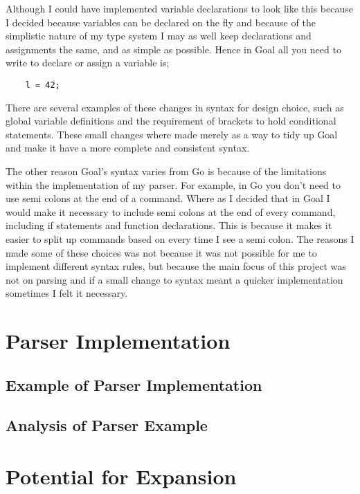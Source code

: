 Although I could have implemented variable declarations to look like this because I decided because variables can be declared on the fly and because of the simplistic nature of my type system I may as well keep declarations and assignments the same, and as simple as possible. Hence in Goal all you need to write to declare or assign a variable is;

\begin{lstlisting}
	l = 42;
\end{lstlisting}
 
There are several examples of these changes in syntax for design choice, such as global variable definitions and the requirement of brackets to hold conditional statements. These small changes where made merely as a way to tidy up Goal and make it have a more complete and consistent syntax. 

The other reason Goal's syntax varies from Go is because of the limitations within the implementation of my parser. For example, in Go you don't need to use semi colons at the end of a command. Where as I decided that in Goal I would make it necessary to include semi colons at the end of every command, including if statements and function declarations. This is because it makes it easier to split up commands based on every time I see a semi colon. The reasons I made some of these choices was not because it was not possible for me to implement different syntax rules, but because the main focus of this project was not on parsing and if a small change to syntax meant a quicker implementation sometimes I felt it necessary. 


\section{Parser Implementation}

\subsection{Example of Parser Implementation}

\subsection{Analysis of Parser Example}

\section{Potential for Expansion}